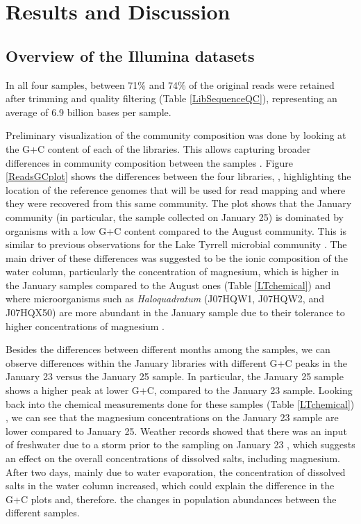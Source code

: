 \clearpage
\section{Results and Discussion}

\subsection{Overview of the Illumina datasets}

In all four samples, between 71\% and 74\% of the original reads were retained after trimming and quality filtering (Table \ref{LibSequenceQC}), representing an average of 6.9 billion bases per sample.

Preliminary visualization of the community composition was done by looking at the G+C content of each of the libraries. This allows capturing broader differences in community composition between the samples \cite{Podell:2013kx,Ghai:2012fb,Podell:2013fp}. Figure \ref{ReadsGCplot} shows the differences between the four libraries, , highlighting the location of the reference genomes that will be used for read mapping and where they were recovered from this same community. The plot shows that the January community (in particular, the sample collected on January 25) is dominated by organisms with a low G+C content compared to the August community. This is similar to previous observations for the Lake Tyrrell microbial community \cite{Podell:2013fp}. The main driver of these differences was suggested to be the ionic composition of the water column, particularly the concentration of magnesium, which is higher in the January samples compared to the August ones (Table \ref{LTchemical}) and where microorganisms such as \textit{Haloquadratum} (J07HQW1, J07HQW2, and J07HQX50) are more abundant in the January sample due to their tolerance to higher concentrations of magnesium \cite{Podell:2013fp}. 

Besides the differences between different months among the samples, we can observe differences within the January libraries with different G+C peaks in the January 23 versus the January 25 sample. In particular, the January 25 sample shows a higher peak at lower G+C, compared to the January 23 sample. Looking back into the chemical measurements done for these samples (Table \ref{LTchemical}) \cite{Podell:2013fp}, we can see that the magnesium concentrations on the January 23 sample are lower compared to January 25. Weather records showed that there was an input of freshwater due to a storm prior to the sampling on January 23 \cite{Podell:2013fp}, which suggests an effect on the overall concentrations of dissolved salts, including magnesium. After two days, mainly due to water evaporation, the concentration of dissolved salts in the water column increased, which could explain the difference in the G+C plots and, therefore. the changes in population abundances between the different samples.



